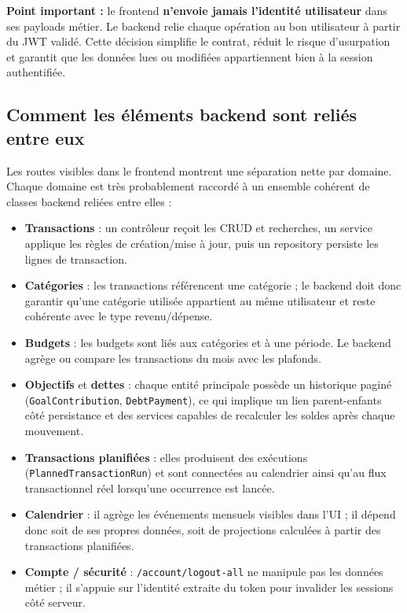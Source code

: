 \documentclass[12pt,a4paper]{article}
\begin{document}
\textbf{Point important :} le frontend \textbf{n'envoie jamais l'identité utilisateur}
dans ses payloads métier. Le backend relie chaque opération au bon utilisateur à
partir du JWT validé. Cette décision simplifie le contrat, réduit le risque
d'usurpation et garantit que les données lues ou modifiées appartiennent bien
à la session authentifiée.

\subsection{Comment les éléments backend sont reliés entre eux}

Les routes visibles dans le frontend montrent une séparation nette par domaine.
Chaque domaine est très probablement raccordé à un ensemble cohérent de classes
backend reliées entre elles :

\begin{itemize}
  \item \textbf{Transactions} : un contrôleur reçoit les CRUD et recherches, un
        service applique les règles de création/mise à jour, puis un repository
        persiste les lignes de transaction.
  \item \textbf{Catégories} : les transactions référencent une catégorie ; le
        backend doit donc garantir qu'une catégorie utilisée appartient au même
        utilisateur et reste cohérente avec le type revenu/dépense.
  \item \textbf{Budgets} : les budgets sont liés aux catégories et à une période.
        Le backend agrège ou compare les transactions du mois avec les plafonds.
  \item \textbf{Objectifs} et \textbf{dettes} : chaque entité principale possède un
        historique paginé (\texttt{GoalContribution}, \texttt{DebtPayment}), ce qui
        implique un lien parent-enfants côté persistance et des services capables
        de recalculer les soldes après chaque mouvement.
  \item \textbf{Transactions planifiées} : elles produisent des exécutions
        (\texttt{PlannedTransaction}\allowbreak\texttt{Run}) et sont connectées au calendrier ainsi qu'au
        flux transactionnel réel lorsqu'une occurrence est lancée.
  \item \textbf{Calendrier} : il agrège les événements mensuels visibles dans l'UI ;
        il dépend donc soit de ses propres données, soit de projections calculées à
        partir des transactions planifiées.
  \item \textbf{Compte / sécurité} : \texttt{/account/logout-all} ne manipule pas les
        données métier ; il s'appuie sur l'identité extraite du token pour invalider
        les sessions côté serveur.
\end{itemize}
\end{document}
